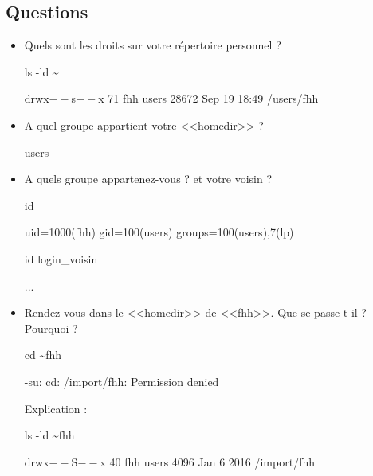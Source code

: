 \documentclass[11pt]{article}
\begin{document}
\subsection{Questions}

\begin{itemize}
 \item Quels sont les droits sur votre répertoire personnel ?
\begin{solution}

ls -ld \textasciitilde{}

drwx$--$s$--$x 71 fhh users 28672 Sep 19 18:49 /users/fhh

\end{solution}
 \item A quel groupe appartient votre <<homedir>> ?
\begin{solution}
users
\end{solution}
 \item A quels groupe appartenez-vous ? et votre voisin ?
\begin{solution}
id

uid=1000(fhh) gid=100(users) groups=100(users),7(lp)

id login\_voisin

...

\end{solution}
 \item Rendez-vous dans le <<homedir>> de <<fhh>>. Que se passe-t-il ? Pourquoi ?
\begin{solution}

cd \textasciitilde{}fhh

-su: cd: /import/fhh: Permission denied

Explication :

ls -ld \textasciitilde{}fhh

drwx$--$S$--$x 40 fhh users 4096 Jan  6  2016 /import/fhh


\end{solution}
\end{itemize}
\end{document}
